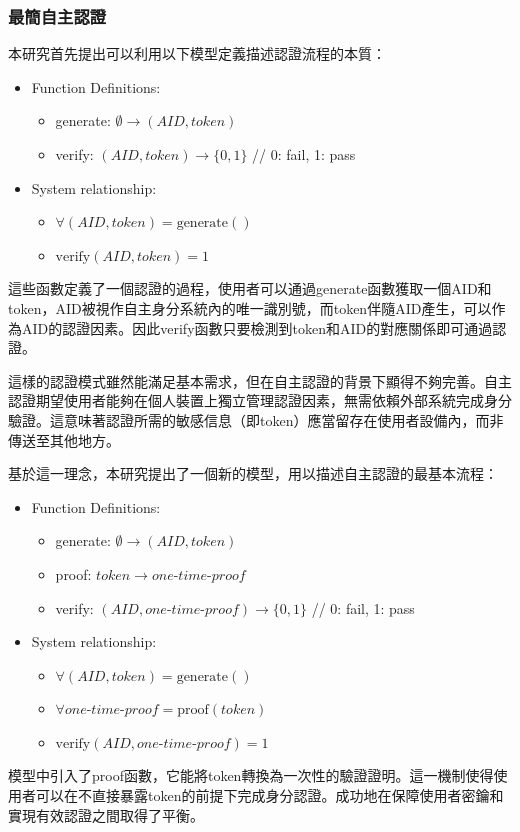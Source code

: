 \subsubsection{最簡自主認證}
本研究首先提出可以利用以下模型定義描述認證流程的本質：
\begin{itemize}
  \item Function Definitions:
        \begin{itemize}
          \item generate: $\emptyset \rightarrow (AID, token)$
          \item verify: $(AID, token) \rightarrow \{0,1\}$ \hfill // 0: fail, 1: pass
        \end{itemize}
  \item System relationship:
        \begin{itemize}
          \item $\forall(AID, token) = \text{generate}()$
          \item $\text{verify}(AID, token) = 1$
        \end{itemize}
\end{itemize}
這些函數定義了一個認證的過程，使用者可以通過generate函數獲取一個AID和token，AID被視作自主身分系統內的唯一識別號，而token伴隨AID產生，可以作為AID的認證因素。因此verify函數只要檢測到token和AID的對應關係即可通過認證。

這樣的認證模式雖然能滿足基本需求，但在自主認證的背景下顯得不夠完善。自主認證期望使用者能夠在個人裝置上獨立管理認證因素，無需依賴外部系統完成身分驗證。這意味著認證所需的敏感信息（即token）應當留存在使用者設備內，而非傳送至其他地方。

基於這一理念，本研究提出了一個新的模型，用以描述自主認證的最基本流程：
\begin{itemize}
  \item Function Definitions:
        \begin{itemize}
          \item generate: $\emptyset \rightarrow (AID, token)$
          \item proof: $token \rightarrow one\text{-}time\text{-}proof$
          \item verify: $(AID, one\text{-}time\text{-}proof) \rightarrow \{0,1\}$ \hfill // 0: fail, 1: pass
        \end{itemize}
  \item System relationship:
        \begin{itemize}
          \item $\forall(AID, token) = \text{generate}()$
          \item $\forall one\text{-}time\text{-}proof = \text{proof}(token)$
          \item $\text{verify}(AID, one\text{-}time\text{-}proof) = 1$
        \end{itemize}
\end{itemize}
模型中引入了proof函數，它能將token轉換為一次性的驗證證明。這一機制使得使用者可以在不直接暴露token的前提下完成身分認證。成功地在保障使用者密鑰和實現有效認證之間取得了平衡。

